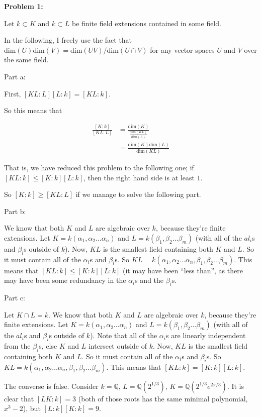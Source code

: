 \documentclass[a4paper,12pt]{article}
\newcommand{\shunt}{\vspace{20mm}}
\newcommand{\al}{\alpha} %
\newcommand{\be}{\beta}
\newcommand{\Q}{\mathbb{Q}}
\begin{document}
{\bf Problem 1:} 

Let $k \subset K$ and $k \subset L$ be finite field extensions contained in some field. 

In the following, I freely use the fact that $\text{dim}(U)\text{dim}(V) = \text{dim}(UV)/\text{dim}(U \cap V)$ for any vector spaces $U$ and $V$ over the same field. 

Part a:

First, $[KL:L][L:k] = [KL:k]$.

So this means that

\begin{align*}
\frac{[K:k]}{[KL:L]} &= \frac{\text{dim}(K)}{\frac{\text{dim}(KL)}{\text{dim}(L)}}\\
&= \frac{\text{dim}(K)\text{dim}(L)}{\text{dim}(KL)}
\end{align*}

That is, we have reduced this problem to the following one; if $[KL:k] \leq [K:k][L:k]$, then the right hand side is at least $1$.

So $[K:k] \geq [KL:L]$ if we manage to solve the following part.

\shunt 

Part b:

We know that both $K$ and $L$ are algebraic over $k$, because they're finite extensions. Let $K = k(\al_1,\al_2 \ldots \al_n)$ and $L = k(\be_1,\be_2 \ldots \be_m)$ (with all of the $al_i$s and $\be_i$s outside of $k$). Now, $KL$ is the smallest field containing both $K$ and $L$. So it must contain all of the $\al_i$s and $\be_i$s. So $KL = k(\al_1,\al_2 \ldots \al_n, \be_1, \be_2 \ldots \be_m)$. This means that $[KL:k] \leq [K:k][L:k]$ (it may have been ``less than'', as there may have been some redundancy in the $\al_i$s and the $\be_i$s.

\shunt 

Part c:

Let $K \cap L = k$. We know that both $K$ and $L$ are algebraic over $k$, because they're finite extensions. Let $K = k(\al_1,\al_2 \ldots \al_n)$ and $L = k(\be_1,\be_2 \ldots \be_m)$ (with all of the $al_i$s and $\be_i$s outside of $k$). Note that all of the $\al_i$s are linearly independent from the $\be_i$s, else $K$ and $L$ intersect outside of $k$. Now, $KL$ is the smallest field containing both $K$ and $L$. So it must contain all of the $\al_i$s and $\be_i$s. So $KL = k(\al_1,\al_2 \ldots \al_n, \be_1, \be_2 \ldots \be_m)$. This means that $[KL:k] = [K:k][L:k]$.

The converse is false. Consider $k = \Q$, $L = \Q(2^{1/3})$, $K = \Q(2^{1/3}e^{2\pi/3})$. It is clear that $[LK: k] = 3$ (both of those roots has the same minimal polynomial, $x^3-2$), but $[L:k][K:k] = 9$.
\end{document}
